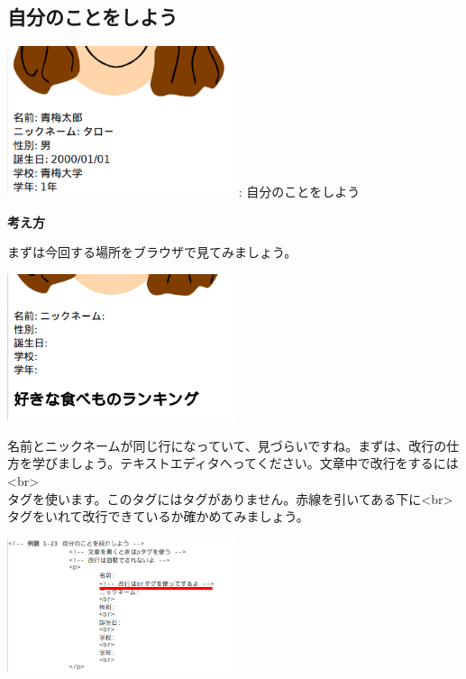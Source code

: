 \documentclass[a4paper,12pt]{jarticle}
\begin{document}
\clearpage
{}
\subsection{\theExercise 自分のことをしよう}
\addtocounter{Exercise}{-1}\label{E:HTML_4}
\centering
\begin{minipage}{\textwidth}
  \includegraphics[width=0.5\textwidth]{textbook-img173.png}
  \newline
  : 自分のことをしよう
\end{minipage}

\bigskip

\flushleft

\textbf{考え方}


\bigskip

まずは今回する場所をブラウザで見てみましょう。

\includegraphics[width=0.5\textwidth]{textbook-img175.png}

\bigskip

\flushleft
名前とニックネームが同じ行になっていて、見づらいですね。まずは、改行の仕方を学びましょう。テキストエディタへってください。文章中で改行をするには\\
{\textless}br{\textgreater} \ \ \ \ \ \\
タグを使います。このタグにはタグがありません。赤線を引いてある下に{\textless}br{\textgreater}タグをいれて改行できているか確かめてみましょう。


\includegraphics[width=0.5\textwidth]{textbook-img174.png}
\end{document}
